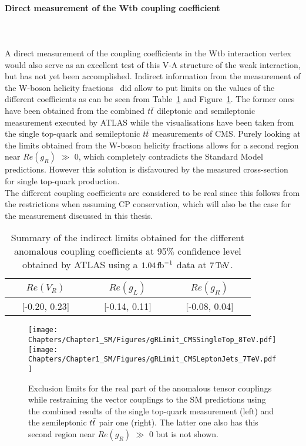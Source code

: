 \paragraph{Direct measurement of the Wtb coupling coefficient} \hfill \\
\\
A direct measurement of the coupling coefficients in the Wtb interaction vertex would also serve as an excellent test of this V-A structure of the weak interaction, but has not yet been accomplished.
Indirect information from the measurement of the W-boson helicity fractions~\cite{AtlasWtbLimits, CMSWHelicityST, CMSWHelicityTop} did allow to put limits on the values of the different coefficients as can be seen from Table~\ref{table::AnomCoupResults} and Figure~\ref{fig::WtbResults}.
The former ones have been obtained from the combined $t\bar{t}$ dileptonic and semileptonic measurement executed by ATLAS while the visualisations have been taken from the single top-quark and semileptonic $t\bar{t}$ measurements of CMS. Purely looking at the limits obtained from the W-boson helicity fractions allows for a second region near $Re(g_R)$ $\gg$ $0$, which completely contradicts the Standard Model predictions. However this solution is disfavoured by the measured cross-section for single top-quark production.
\\
The different coupling coefficients are considered to be real since this follows from the restrictions when assuming CP conservation, which will also be the case for the measurement discussed in this thesis.
\begin{table}[h!t]
 \caption{Summary of the indirect limits obtained for the different anomalous coupling coefficients at 95$\%$ confidence level obtained by ATLAS using a $1.04\, \mathrm{fb}^{-1}$ data at $7\, \mathrm{TeV}$.} \label{table::AnomCoupResults}
 \centering
 \begin{tabular}{c|c|c}
  $Re(V_R)$ 		& $Re(g_L)$ 		& $Re(g_R)$ 		\\
  \hline
  ~~ [-0.20, 0.23] ~~	& ~~ [-0.14, 0.11] ~~	& ~~ [-0.08, 0.04] ~~	\\
 \end{tabular}
\end{table}

\begin{figure}[h!t]
 \centering
 \texttt{[image: Chapters/Chapter1\_SM/Figures/gRLimit\_CMSSingleTop\_8TeV.pdf]}
 \texttt{[image: Chapters/Chapter1\_SM/Figures/gRLimit\_CMSLeptonJets\_7TeV.pdf]}
 \caption{Exclusion limits for the real part of the anomalous tensor couplings while restraining the vector couplings to the SM predictions using the combined results of the single top-quark measurement (left) and the semileptonic $t\bar{t}$ pair one (right). The latter one also has this second region near $Re(g_R)$ $\gg$ $0$ but is not shown.} \label{fig::WtbResults}
\end{figure}

